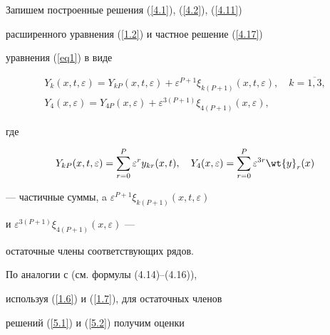 Запишем построенные решения (\ref{4.1}), (\ref{4.2}), (\ref{4.11})


расширенного уравнения (\ref{1.2}) и частное решение (\ref{4.17})


уравнения (\ref{eq1}) в виде


\begin{gather}


\label{5.1}


Y_k (x, t, \varepsilon) = Y_{kP} (x, t, \varepsilon) + \varepsilon^{P+1}


\xi_{k(P+1)} (x, t, \varepsilon), \quad k =\overline{1,3},\\


%


\label{5.2}


Y_4 (x, \varepsilon) = Y_{4P} (x, \varepsilon) +


\varepsilon^{3(P+1)} \xi_{4(P+1)} (x, \varepsilon),


\end{gather}


где


$$


Y_{kP} (x, t, \varepsilon) = \sum \limits_{r = 0}^P \varepsilon^r


y_{kr}(x, t), \quad Y_{4} (x, \varepsilon) = \sum \limits_{r = 0}^P


\varepsilon^{3r} \wt{y}_r (x)


$$


--- частичные суммы, a $\varepsilon^{P+1} \xi_{k(P+1)} (x, t, \varepsilon)$


и $ \varepsilon^{3(P+1)} \xi_{4(P+1)} (x, \varepsilon)$ ---


остаточные члены соответствующих рядов.








По аналогии с \cite{Bobochko2} (см. формулы (4.14)--(4.16)),


используя (\ref{1.6}) и (\ref{1.7}), для остаточных членов


решений (\ref{5.1}) и (\ref{5.2}) получим оценки


